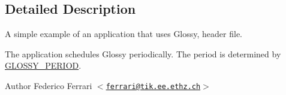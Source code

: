 \subsection{Detailed Description}
A simple example of an application that uses Glossy, header file.

The application schedules Glossy periodically. The period is determined by \hyperlink{group__glossy-test-settings_ga6f68058577fdbfccbd8e50537609a5e4}{GLOSSY\_\-PERIOD}. \begin{DoxyAuthor}{Author}
Federico Ferrari $<$\href{mailto:ferrari@tik.ee.ethz.ch}{\tt ferrari@tik.ee.ethz.ch}$>$ 
\end{DoxyAuthor}
